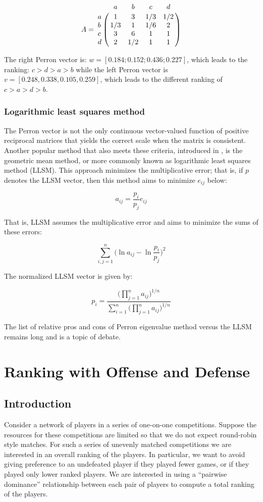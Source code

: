 \documentclass[a4,11pt,twoside,leqno]{report}
\theoremstyle{definition}
\theoremstyle{remark}
\numberwithin{equation}{section}
\begin{document}
$$A=\bordermatrix{\ & a & b & c & d \cr a & 1 & 3 & 1/3 & 1/2  \cr b & 1/3 & 1 & 1/6 & 2 \cr c & 3 & 6 & 1 &1\cr d & 2 & 1/2 & 1 & 1}$$

\vspace{5mm}

The right Perron vector is: $w=[0.184; 0.152; 0.436; 0.227]$, which leads to the ranking: $c>d >a >b$ while the left Perron vector is $v=[0.248, 0.338, 0.105, 0.259]$, which leads to the different ranking of $c>a>d>b$.

\subsection{Logarithmic least squares method}

The Perron vector is not the only continuous vector-valued function of positive reciprocal matrices that yields the correct scale when the matrix is consistent. Another popular method that also meets these criteria, introduced in \cite{crawford}, is the geometric mean method, or more commonly known as logarithmic least squares method (LLSM). This approach minimizes the multiplicative error; that is, if $p$ denotes the LLSM vector, then this method aims to minimize $e_{ij}$ below:

$$a_{ij}=\frac{p_i}{p_j}e_{ij}$$

That is, LLSM assumes the multiplicative error and aims to minimize the sums of these errors:

$$\displaystyle \sum_{i,j=1}^n \big(\ln{a_{ij}}-\ln{\frac{p_i}{p_j}}\big)^2$$


The normalized LLSM vector is given by:

$$p_i= \frac{\displaystyle\Big(\prod_{j=1}^n a_{ij}\Big)^{1/n}}{\displaystyle \sum_{i=1}^{n}\Big(\prod_{j=1}^n a_{ij}\Big)^{1/n}}$$

The list of relative pros and cons of Perron eigenvalue method versus the LLSM remains long and is a topic of debate. 

\chapter{Ranking with Offense and Defense}

\section{Introduction}
Consider a network of players in a series of one-on-one competitions.  Suppose
the resources for these competitions are limited so that we do not expect
round-robin style matches.  For such a series of unevenly matched competitions
we are interested in an overall ranking of the players.  In particular, we want
to avoid giving preference to an undefeated player if they played fewer games,
or if they played only lower ranked players.  We are interested in using a
``pairwise dominance'' relationship between each pair of players to compute a
total ranking of the players.
\end{document}
